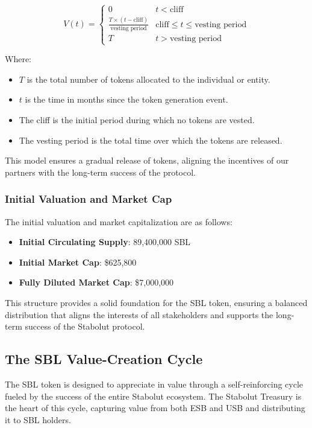 \begin{equation}
V(t) = 
\begin{cases} 
      0 & t < \text{cliff} \\
      \frac{T \times (t - \text{cliff})}{\text{vesting period}} & \text{cliff} \leq t \leq \text{vesting period} \\
      T & t > \text{vesting period}
   \end{cases}
\end{equation}

Where:
\begin{itemize}
    \item $T$ is the total number of tokens allocated to the individual or entity.
    \item $t$ is the time in months since the token generation event.
    \item The cliff is the initial period during which no tokens are vested.
    \item The vesting period is the total time over which the tokens are released.
\end{itemize}

This model ensures a gradual release of tokens, aligning the incentives of our partners with the long-term success of the protocol.


\subsubsection{Initial Valuation and Market Cap}
The initial valuation and market capitalization are as follows:
\begin{itemize}
    \item \textbf{Initial Circulating Supply}: 89,400,000 SBL
    \item \textbf{Initial Market Cap}: \$625,800
    \item \textbf{Fully Diluted Market Cap}: \$7,000,000
\end{itemize}

This structure provides a solid foundation for the SBL token, ensuring a balanced distribution that aligns the interests of all stakeholders and supports the long-term success of the Stabolut protocol.

\subsection{The SBL Value-Creation Cycle}
The SBL token is designed to appreciate in value through a self-reinforcing cycle fueled by the success of the entire Stabolut ecosystem. The Stabolut Treasury is the heart of this cycle, capturing value from both ESB and USB and distributing it to SBL holders.

